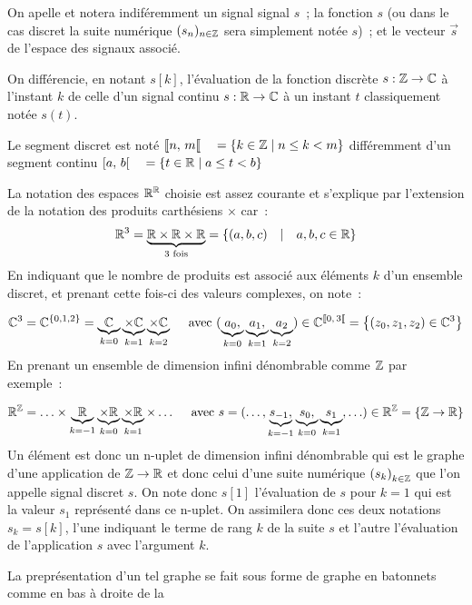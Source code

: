 \begin{remarque}
  On apelle et notera indiféremment un signal signal $s$~; la fonction
  $s$ (ou dans le cas discret la suite numérique $(s_n)_{n\in\mathbb{Z}}$ sera
  simplement notée $s$)~; et le vecteur $\vec{s}$ de l'espace des
  signaux associé.

  On différencie, en notant $s[k]$, l'évaluation de la fonction
  discrète $s: \mathbb{Z}\to\mathbb{C}$ à l'instant $k$ de celle d'un signal continu
  $s: \mathbb{R}\to\mathbb{C}$ à un instant $t$ classiquement notée $s(t)$.
  
  Le segment discret est noté ${[\![ n,\,m[\![} \quad =\left\{k \in\mathbb{Z} \;|\; n\leq k < m\right\}$ différemment d'un segment continu ${\left[ a,\,b \right[} \quad =\left\{t\in\mathbb{R} \;|\; a\leq t < b\right\}$

  La notation des espaces $\mathbb{R}^{\mathbb{R}}$ choisie est assez courante et
  s'explique par l'extension de la notation des produits carthésiens
  $\times$ car~:
  $$ \mathbb{R}^3 = \underbrace{\mathbb{R}\times\mathbb{R}\times\mathbb{R}}_{\text{3 fois}} = \left\{ (a, b, c) \quad|\quad a,b,c \in \mathbb{R} \right\}$$
  En indiquant que le nombre de produits est associé aux éléments $k$ d'un ensemble discret, et prenant cette fois-ci des valeurs complexes, on note~:
  
  $$ \mathbb{C}^3 = \mathbb{C}^{\left\{0, 1, 2\right\}} = \underbrace{\mathbb{C}}_{k=0}\underbrace{\times\mathbb{C}}_{k=1}\underbrace{\times\mathbb{C}}_{k=2} \quad\text{ avec } (\underbrace{a_0, }_{k=0}\underbrace{a_1, }_{k=1}\underbrace{a_2}_{k=2}) \in  \mathbb{C}^{{[\![ 0,\,3[\![}} = \left\{ (z_0, z_1, z_2) \in \mathbb{C}^3 \right\}$$
  En prenant un ensemble de dimension infini dénombrable comme $\mathbb{Z}$  par exemple~:

  $$ \mathbb{R}^{\mathbb{Z}} = \ldots \times \underbrace{\mathbb{R}}_{k=-1} \underbrace{\times\mathbb{R}}_{k=0} \underbrace{\times\mathbb{R}}_{k=1} \times \ldots \quad\text{ avec } s=(\ldots, \underbrace{s_{-1}, }_{k=-1}\underbrace{s_0, }_{k=0}\underbrace{s_1}_{k=1}, \ldots) \in  \mathbb{R}^{\mathbb{Z}}= \left\{\mathbb{Z}\to\mathbb{R}\right\}$$
  Un élément est donc un n-uplet de dimension infini dénombrable qui
  est le graphe d'une application de $\mathbb{Z}\to\mathbb{R}$ et donc celui d'une
  suite numérique $\left(s_k\right)_{k\in\mathbb{Z}}$ que l'on appelle signal
  discret $s$. On note donc $s[1]$ l'évaluation de $s$ pour $k=1$ qui
  est la valeur $s_1$ représenté dans ce n-uplet. On assimilera donc
  ces deux notations $s_k=s[k]$, l'une indiquant le terme de rang $k$
  de la suite $s$ et l'autre l'évaluation de l'application $s$ avec
  l'argument $k$.

  La preprésentation d'un tel graphe se fait sous forme de graphe en
  \og{} batonnets\fg{} comme en bas à droite de la


\end{remarque}
